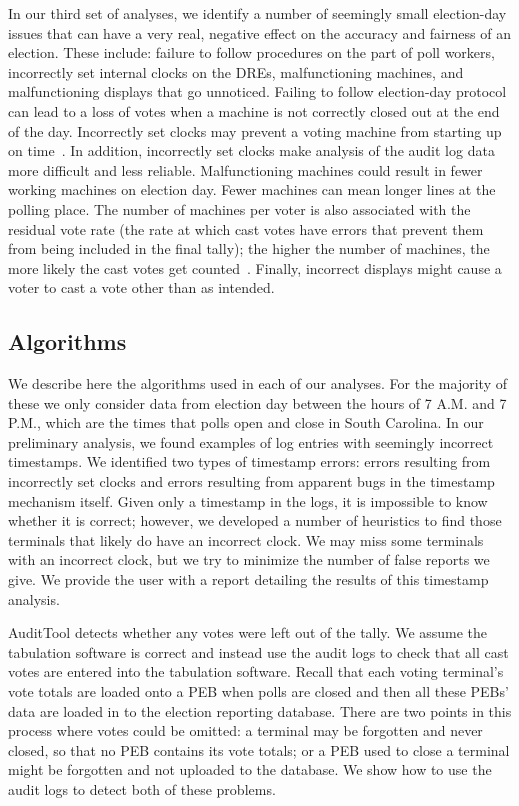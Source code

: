 \documentclass[letterpaper,twocolumn,10pt]{article}
\begin{document}
In our third set of analyses, we identify a number of seemingly small
election-day issues that can have a very real, negative effect on the accuracy
and fairness of an election. These include:
failure to follow procedures on the part of poll workers, incorrectly set
internal clocks on the DREs, malfunctioning machines, and malfunctioning
displays that go unnoticed.  
Failing to follow election-day protocol can lead to a loss of votes when a
machine is not correctly closed out at the end of the day. Incorrectly set
clocks may prevent a voting machine from starting up on
time~\cite{VotUn2007}. In addition, incorrectly set clocks make analysis of the
audit log data more difficult and less reliable. Malfunctioning machines could
result in fewer working machines on election day. Fewer machines can mean longer
lines at the polling place. The number of machines per voter is also associated
with the residual vote rate (the rate at which cast votes have errors that
prevent them from being included in the final tally); the higher the number of
machines, the more likely the cast votes get counted~\cite{DNC2005}. Finally,
incorrect displays might cause a voter to cast a vote other than as intended.
 
\subsection{Algorithms}
We describe here the algorithms used in each of our analyses. For the
majority of these we only consider data from election day between the hours of
7 A.M. and 7 P.M., which are the times that polls open and close in South
Carolina. In our preliminary analysis, we found examples of log entries with
seemingly incorrect timestamps. We identified two types of timestamp errors:
errors resulting from incorrectly set clocks and errors resulting from apparent
bugs in the timestamp mechanism itself. Given only a timestamp in the logs, it
is impossible to know whether it is correct; however, we developed a number of
heuristics to find those terminals that likely do have an incorrect clock. We
may miss some terminals with an incorrect clock, but we try to minimize the
number of false reports we give. We provide the user with a report detailing the
results of this timestamp analysis.  

AuditTool detects whether any votes were left out of the tally. We assume the
tabulation software is correct and instead use the audit logs to check that all
cast votes are entered into the tabulation software. Recall that each voting
terminal’s vote totals are loaded onto a PEB when polls are closed and then all
these PEBs’ data are loaded in to the election reporting database. There are two
points in this process where votes could be omitted: a terminal may be forgotten
and never closed, so that no PEB contains its vote totals; or a PEB used to
close a terminal might be forgotten and not uploaded to the database. We show
how to use the audit logs to detect both of these problems.  
\end{document}
